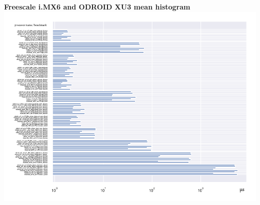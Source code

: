 \textbf{Freescale i.MX6 and ODROID XU3 mean histogram}\newline
\hspace*{-3.2cm}
\includegraphics[width=570pt]{boards_mean_histogram.pdf}
\clearpage




